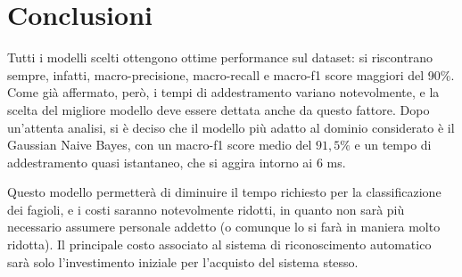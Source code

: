 \section{Conclusioni}
Tutti i modelli scelti ottengono ottime performance sul dataset: si riscontrano
sempre, infatti, macro-precisione, macro-recall e macro-f1 score maggiori del 90\%.
Come già affermato, però, i tempi di addestramento variano notevolmente,
e la scelta del migliore modello deve essere dettata anche da questo fattore.
Dopo un'attenta analisi, si è deciso che il modello più adatto al dominio considerato
è il Gaussian Naive Bayes, con un macro-f1 score medio del $91,5\%$
e un tempo di addestramento quasi istantaneo, che si aggira intorno ai 6 ms. 

Questo modello permetterà di diminuire il tempo richiesto per la classificazione
dei fagioli, e i costi saranno notevolmente ridotti, in quanto non sarà più 
necessario assumere personale addetto (o comunque lo si farà in maniera molto ridotta).
Il principale costo associato al sistema di riconoscimento automatico sarà
solo l'investimento iniziale per l'acquisto del sistema stesso.